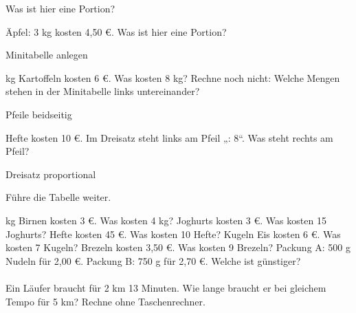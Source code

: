 \setcounter{aufgabe}{11}

\begin{aufgabe}{Was ist hier eine Portion?}
\begin{teile}
\teil Äpfel: 3 kg kosten 4,50 €. Was ist hier eine Portion?
\end{teile}
\end{aufgabe}

\begin{aufgabe}{Minitabelle anlegen}
\begin{teile}
 kg Kartoffeln kosten 6 €. Was kosten 8 kg? Rechne noch nicht: Welche Mengen stehen in der Minitabelle links untereinander?
\end{teile}
\end{aufgabe}

\begin{aufgabe}{Pfeile beidseitig}
\begin{teile}
 Hefte kosten 10 €. Im Dreisatz steht links am Pfeil „: 8“. Was steht rechts am Pfeil?
\end{teile}
\end{aufgabe}

\begin{aufgabe}{Dreisatz proportional}
\begin{teile}
\teil Führe die Tabelle weiter.

 kg Birnen kosten 3 €. Was kosten 4 kg? \leerfeld[€]
 Joghurts kosten 3 €. Was kosten 15 Joghurts? \leerfeld[€]
 Hefte kosten 45 €. Was kosten 10 Hefte? \leerfeld[€]
 Kugeln Eis kosten 6 €. Was kosten 7 Kugeln? \leerfeld[€]
 Brezeln kosten 3,50 €. Was kosten 9 Brezeln? \leerfeld[€]
\teil Packung A: 500 g Nudeln für 2,00 €. Packung B: 750 g für 2,70 €. Welche ist günstiger? \\  \\ 
\teil Ein Läufer braucht für 2 km 13 Minuten. Wie lange braucht er bei gleichem Tempo für 5 km? Rechne ohne Taschenrechner. \leerfeld[min]
\end{teile}
\end{aufgabe}

